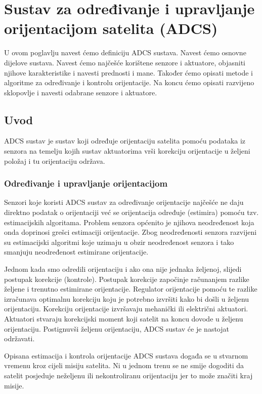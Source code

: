 \documentclass[times, utf8, diplomski, numeric]{templates/template}
\begin{document}
\chapter{Sustav za određivanje i upravljanje orijentacijom satelita (ADCS)}{
    U ovom poglavlju navest ćemo definiciju ADCS  sustava. Navest ćemo osnovne dijelove sustava. Navest ćemo najčešće korištene senzore i aktuatore, objasniti njihove karakteristike i navesti prednosti i mane. Također ćemo opisati metode i algoritme za određivanje i kontrolu orijentacije. Na koncu ćemo opisati razvijeno sklopovlje i navesti odabrane senzore i aktuatore. 

    \section{Uvod}{
        ADCS sustav je sustav koji određuje orijentaciju satelita pomoću podataka iz senzora na temelju kojih sustav aktuatorima vrši korekciju orijentacije u željeni položaj i tu orijentaciju održava. 

        \subsection{Određivanje i upravljanje orijentacijom}{
            Senzori koje koristi ADCS sustav za određivanje orijentacije najčešće ne daju direktno podatak o orijentaciji već se orijentacija određuje (estimira) pomoću tzv. estimacijskih algoritama. Problem senzora općenito je njihova neodređenost koja onda doprinosi grešci estimaciji orijentacije. Zbog neodređenosti senzora razvijeni su estimacijski algoritmi koje uzimaju u obzir neodređenost senzora i tako smanjuju neodređenost estimirane orijentacije.

            Jednom kada smo odredili orijentaciju i ako ona nije jednaka željenoj, slijedi postupak korekcije (kontrole). Postupak korekcije započinje računanjem razlike željene i trenutno estimirane orijentacije. Regulator orijentacije pomoću te razlike izračunava optimalnu korekciju koju je potrebno izvršiti kako bi došli u željenu orijentaciju. Korekciju orijentacije izvršavaju mehanički ili električni aktuatori. Aktuatori stvaraju korekcijski moment koji satelit na koncu dovode u željenu orijentaciju. Postignuvši željenu orijentaciju, ADCS sustav će je nastojat održavati.

            Opisana estimacija i kontrola orijentacije ADCS sustava događa se u stvarnom vremenu kroz cijeli misiju satelita. Ni u jednom trenu se ne smije dogoditi da satelit posjeduje neželjenu ili nekontroliranu orijentaciju jer to može značiti kraj misije.
        }

}}
\end{document}
